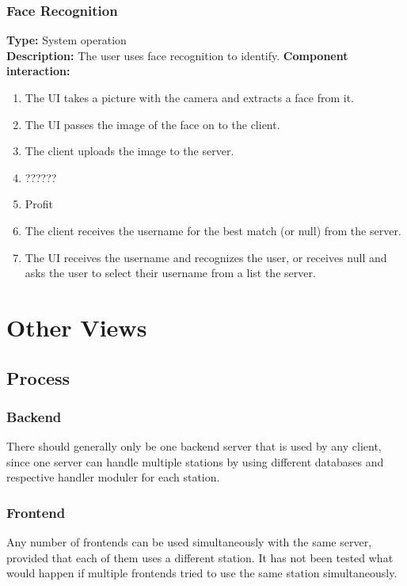 \documentclass[11pt]{article}
\begin{document}
\subsubsection{Face Recognition}
\label{sec:recognition}
\textbf{Type:} System operation\\
\textbf{Description:} The user uses face recognition to identify.
\textbf{Component interaction:}
\begin{enumerate}
\item{The UI takes a picture with the camera and extracts a face from it.}
\item{The UI passes the image of the face on to the client.}
\item{The client uploads the image to the server.}
\item{??????}
\item{Profit}
\item{The client receives the username for the best match (or null) from the server.}
\item{The UI receives the username and recognizes the user, or receives null and asks the user to select their username from a list the server.}
\end{enumerate}

\section{Other Views}


\subsection{Process}
\subsubsection*{Backend}
There should generally only be one backend server that is used by any
client, since one server can handle multiple stations by using
different databases and respective handler moduler for each station.

\subsubsection*{Frontend}
Any number of frontends can be used simultaneously with the same
server, provided that each of them uses a different station. It has
not been tested what would happen if multiple frontends tried to use the
same station simultaneously.
\end{document}
